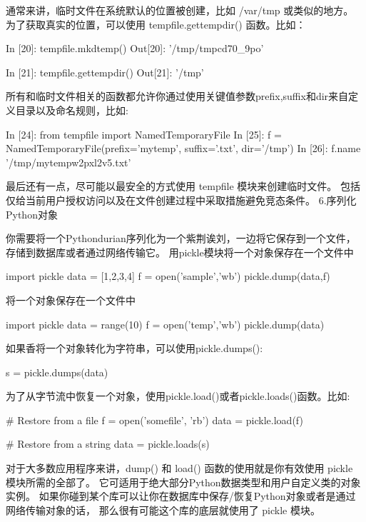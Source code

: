 通常来讲，临时文件在系统默认的位置被创建，比如 /var/tmp 或类似的地方。 为了获取真实的位置，可以使用 tempfile.gettempdir() 函数。比如：
\begin{python}
In [20]: tempfile.mkdtemp()
Out[20]: '/tmp/tmpcd70_9po'

In [21]: tempfile.gettempdir()
Out[21]: '/tmp'
\end{python}
所有和临时文件相关的函数都允许你通过使用关键值参数prefix,suffix和dir来自定义目录以及命名规则，比如:
\begin{python}
In [24]: from tempfile import NamedTemporaryFile
In [25]: f = NamedTemporaryFile(prefix='mytemp', suffix='.txt', dir='/tmp')
In [26]: f.name
'/tmp/mytempw2pxl2v5.txt'
\end{python}
最后还有一点，尽可能以最安全的方式使用 tempfile 模块来创建临时文件。 包括仅给当前用户授权访问以及在文件创建过程中采取措施避免竞态条件。
6.序列化Python对象\par
你需要将一个Pythondurian序列化为一个紫荆诶刘，一边将它保存到一个文件，存储到数据库或者通过网络传输它。\newline
用pickle模块将一个对象保存在一个文件中
\begin{python}
import pickle
data = [1,2,3,4]
f = open('sample','wb')
pickle.dump(data,f)
\end{python}
将一个对象保存在一个文件中
\begin{python}
import pickle
data = range(10)
f = open('temp','wb')
pickle.dump(data)
\end{python}
如果香将一个对象转化为字符串，可以使用pickle.dumps():
\begin{python}
s = pickle.dumps(data)
\end{python}
为了从字节流中恢复一个对象，使用pickle.load()或者pickle.loads()函数。比如:
\begin{python}
# Restore from a file
f = open('somefile', 'rb')
data = pickle.load(f)

# Restore from a string
data = pickle.loads(s)
\end{python}
对于大多数应用程序来讲，dump() 和 load() 函数的使用就是你有效使用 pickle 模块所需的全部了。 它可适用于绝大部分Python数据类型和用户自定义类的对象实例。 如果你碰到某个库可以让你在数据库中保存/恢复Python对象或者是通过网络传输对象的话， 那么很有可能这个库的底层就使用了 pickle 模块。

